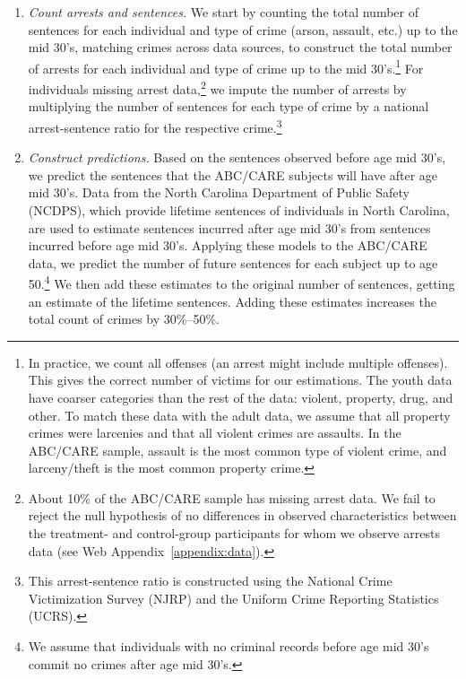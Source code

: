 \begin{enumerate}
\item \textit{Count arrests and sentences.} We start by counting the total number of sentences for each individual and type of crime (arson, assault, etc.) up to the mid 30's, matching crimes across data sources, to construct the total number of  arrests for each individual and type of crime up to the mid 30's.\footnote{In practice, we count all offenses (an arrest might include multiple offenses). This gives the correct number of victims for our estimations. The youth data have coarser categories than the rest of the data: violent, property, drug, and other. To match these data with the adult data, we assume that all property crimes were larcenies and that all violent crimes are assaults. In the ABC/CARE sample, assault is the most common type of violent crime, and larceny/theft is the most common property crime.} For individuals missing arrest data,\footnote{About 10\% of the ABC/CARE sample has missing arrest data. We fail to reject the null hypothesis of no differences in observed characteristics between the treatment- and control-group participants for whom we observe arrests data (see Web Appendix~\ref{appendix:data}).} we impute the number of arrests by multiplying the number of sentences for each type of crime by a national arrest-sentence ratio for the respective crime.\footnote{This arrest-sentence ratio is constructed using the National Crime Victimization Survey (NJRP) and the Uniform Crime Reporting Statistics (UCRS).}

\item \textit{Construct predictions.} Based on the sentences observed before age mid 30's, we predict the sentences that the ABC/CARE subjects will have after age mid 30's. Data from the North Carolina Department of Public Safety (NCDPS), which provide lifetime sentences of individuals in North Carolina, are used to estimate sentences incurred after age mid 30's from sentences incurred before age mid 30's. Applying these models to the ABC/CARE data, we predict the number of future sentences for each subject up to age 50.\footnote{We assume that individuals with no criminal records before age mid 30's commit no crimes after age mid 30's.} We then add these estimates to the original number of sentences, getting an estimate of the lifetime sentences. Adding these estimates increases the total count of crimes by 30\%--50\%.


\end{enumerate}
